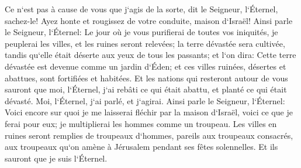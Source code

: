 \verse Ce n`est pas à cause de vous que j`agis de la sorte, dit le Seigneur, l`Éternel, sachez-le! Ayez honte et rougissez de votre conduite, maison d`Israël! 
\verse Ainsi parle le Seigneur, l`Éternel: Le jour où je vous purifierai de toutes vos iniquités, je peuplerai les villes, et les ruines seront relevées; 
\verse la terre dévastée sera cultivée, tandis qu`elle était déserte aux yeux de tous les passants; 
\verse et l`on dira: Cette terre dévastée est devenue comme un jardin d`Éden; et ces villes ruinées, désertes et abattues, sont fortifiées et habitées. 
\verse Et les nations qui resteront autour de vous sauront que moi, l`Éternel, j`ai rebâti ce qui était abattu, et planté ce qui était dévasté. Moi, l`Éternel, j`ai parlé, et j`agirai. 
\verse Ainsi parle le Seigneur, l`Éternel: Voici encore sur quoi je me laisserai fléchir par la maison d`Israël, voici ce que je ferai pour eux; je multiplierai les hommes comme un troupeau. 
\verse Les villes en ruines seront remplies de troupeaux d`hommes, pareils aux troupeaux consacrés, aux troupeaux qu`on amène à Jérusalem pendant ses fêtes solennelles. Et ils sauront que je suis l`Éternel. 

